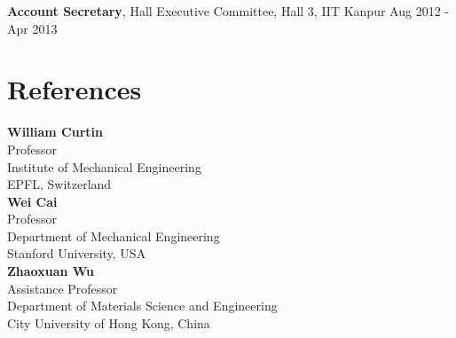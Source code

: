 \documentclass[margin,line]{resume}
\begin{document}
\begin{resume}
    \vspace{-0.3cm}
    \textbf{\textsf{Account Secretary}}, Hall Executive Committee, Hall 3,  IIT Kanpur \hfill \small{Aug 2012 - Apr 2013}
    ­%

    \section{\mysidestyle References}
    \textbf{\textsf{William Curtin}}\\
    Professor\\
    Institute of Mechanical Engineering\\
    EPFL, Switzerland\\[1em]
    \textbf{\textsf{Wei Cai}}\\
    Professor\\
    Department of Mechanical Engineering\\
    Stanford University, USA \\ [1em]
    \textbf{\textsf{Zhaoxuan Wu}}\\
    Assistance Professor\\
    Department of Materials Science and Engineering\\
    City University of Hong Kong, China\\[1em]


\end{resume}
\end{document}
